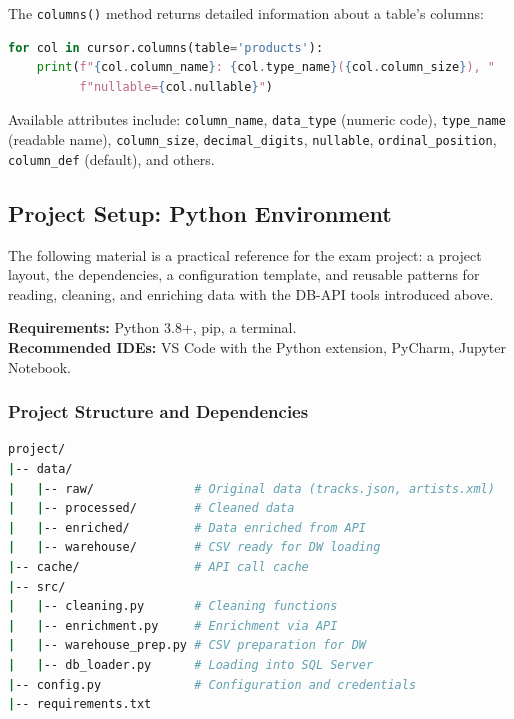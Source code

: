 The \texttt{columns()} method returns detailed information about a table's columns:

\begin{lstlisting}[language=Python, basicstyle=\ttfamily\scriptsize]
for col in cursor.columns(table='products'):
    print(f"{col.column_name}: {col.type_name}({col.column_size}), "
          f"nullable={col.nullable}")
\end{lstlisting}

Available attributes include: \texttt{column\_name}, \texttt{data\_type} (numeric code), \texttt{type\_name} (readable name), \texttt{column\_size}, \texttt{decimal\_digits}, \texttt{nullable}, \texttt{ordinal\_position}, \texttt{column\_def} (default), and others.


\subsection{Project Setup: Python Environment}
\label{sec:python-setup}

The following material is a practical reference for the exam project: a project layout, the dependencies, a configuration template, and reusable patterns for reading, cleaning, and enriching data with the DB-API tools introduced above.

\begin{notebox}
\textbf{Requirements:} Python 3.8+, pip, a terminal. \\
\textbf{Recommended IDEs:} VS Code with the Python extension, PyCharm, Jupyter Notebook.
\end{notebox}

\subsubsection{Project Structure and Dependencies}
\label{subsec:project-structure}

\begin{lstlisting}[language=bash]
project/
|-- data/
|   |-- raw/              # Original data (tracks.json, artists.xml)
|   |-- processed/        # Cleaned data
|   |-- enriched/         # Data enriched from API
|   |-- warehouse/        # CSV ready for DW loading
|-- cache/                # API call cache
|-- src/
|   |-- cleaning.py       # Cleaning functions
|   |-- enrichment.py     # Enrichment via API
|   |-- warehouse_prep.py # CSV preparation for DW
|   |-- db_loader.py      # Loading into SQL Server
|-- config.py             # Configuration and credentials
|-- requirements.txt
\end{lstlisting}

